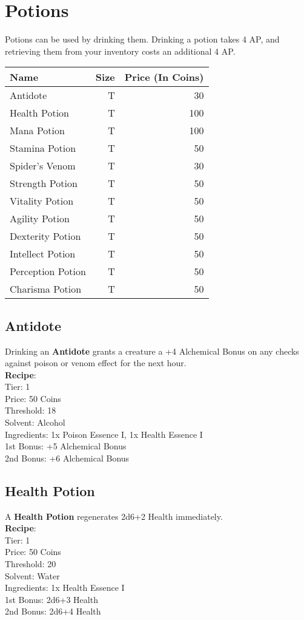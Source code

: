 \section{Potions}\label{sec:potions}
Potions can be used by drinking them.
Drinking a potion takes 4 AP, and retrieving them from your inventory costs an additional 4 AP.

\begin{longtable}{l | r | r}
	Name & Size & Price (In Coins)\\ \hline
	Antidote & T & 30\\
	Health Potion & T & 100\\
	Mana Potion & T & 100\\
	Stamina Potion & T & 50\\
	Spider's Venom & T & 30\\
	Strength Potion & T & 50\\
	Vitality Potion & T & 50\\
	Agility Potion & T & 50\\
	Dexterity Potion & T & 50\\
	Intellect Potion & T & 50\\
	Perception Potion & T & 50\\
	Charisma Potion & T & 50\\
\end{longtable}

\subsection{Antidote}\label{potion:antidote}
Drinking an \textbf{Antidote} grants a creature a +4 Alchemical Bonus on any checks against poison or venom effect for the next hour.\\
\textbf{Recipe}:\\
Tier: 1\\
Price: 50 Coins \\
Threshold: 18\\
Solvent: Alcohol\\
Ingredients: 1x Poison Essence I, 1x Health Essence I\\
1st Bonus: +5 Alchemical Bonus\\
2nd Bonus: +6 Alchemical Bonus\\

\subsection{Health Potion}\label{potion:healthPotion}
A \textbf{Health Potion} regenerates 2d6+2 Health immediately.\\
\textbf{Recipe}:\\
Tier: 1\\
Price: 50 Coins\\
Threshold: 20\\
Solvent: Water\\
Ingredients: 1x Health Essence I\\
1st Bonus: 2d6+3 Health\\
2nd Bonus: 2d6+4 Health\\

